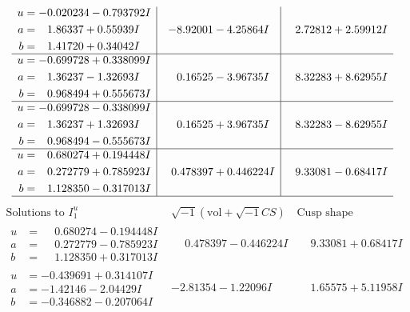 \documentclass[1p]{elsarticle_modified}
\theoremstyle{definition}
\newcommand{\I}{\sqrt{-1}}
\begin{document}
$$\begin{array}{c|c|c}
\begin{aligned}
u &= -0.020234 - 0.793792 I \\
a &= \phantom{-}1.86337 + 0.55939 I \\
b &= \phantom{-}1.41720 + 0.34042 I\end{aligned}
 & -8.92001 - 4.25864 I & \phantom{-}2.72812 + 2.59912 I \\ \hline\begin{aligned}
u &= -0.699728 + 0.338099 I \\
a &= \phantom{-}1.36237 - 1.32693 I \\
b &= \phantom{-}0.968494 + 0.555673 I\end{aligned}
 & \phantom{-}0.16525 - 3.96735 I & \phantom{-}8.32283 + 8.62955 I \\ \hline\begin{aligned}
u &= -0.699728 - 0.338099 I \\
a &= \phantom{-}1.36237 + 1.32693 I \\
b &= \phantom{-}0.968494 - 0.555673 I\end{aligned}
 & \phantom{-}0.16525 + 3.96735 I & \phantom{-}8.32283 - 8.62955 I \\ \hline\begin{aligned}
u &= \phantom{-}0.680274 + 0.194448 I \\
a &= \phantom{-}0.272779 + 0.785923 I \\
b &= \phantom{-}1.128350 - 0.317013 I\end{aligned}
 & \phantom{-}0.478397 + 0.446224 I & \phantom{-}9.33081 - 0.68417 I\\
 \hline 
 \end{array}$$\newpage$$\begin{array}{c|c|c}  
\text{Solutions to }I^u_{1}& \I (\text{vol} + \sqrt{-1}CS) & \text{Cusp shape}\\
 \hline 
\begin{aligned}
u &= \phantom{-}0.680274 - 0.194448 I \\
a &= \phantom{-}0.272779 - 0.785923 I \\
b &= \phantom{-}1.128350 + 0.317013 I\end{aligned}
 & \phantom{-}0.478397 - 0.446224 I & \phantom{-}9.33081 + 0.68417 I \\ \hline\begin{aligned}
u &= -0.439691 + 0.314107 I \\
a &= -1.42146 - 2.04429 I \\
b &= -0.346882 - 0.207064 I\end{aligned}
 & -2.81354 - 1.22096 I & \phantom{-}1.65575 + 5.11958 I \\ \hline\begin{aligned}

\end{aligned}
\end{array}$$
\end{document}
